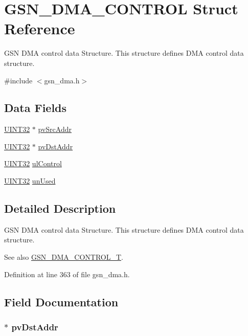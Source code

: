 \hypertarget{a00050}{
\section{GSN\_\-DMA\_\-CONTROL Struct Reference}
\label{a00050}
}


GSN DMA control data Structure. This structure defines DMA control data structure.  




{\ttfamily \#include $<$gsn\_\-dma.h$>$}

\subsection*{Data Fields}
\begin{DoxyCompactItemize}
\item 
\hyperlink{a00660_gae1e6edbbc26d6fbc71a90190d0266018}{UINT32} $\ast$ \hyperlink{a00050_a369c025bb6fdbac8a9c503cb2ae90d5b}{pvSrcAddr}
\item 
\hyperlink{a00660_gae1e6edbbc26d6fbc71a90190d0266018}{UINT32} $\ast$ \hyperlink{a00050_a5c0a75647c788624e72f3071e0f3c013}{pvDstAddr}
\item 
\hyperlink{a00660_gae1e6edbbc26d6fbc71a90190d0266018}{UINT32} \hyperlink{a00050_a5010fc8f1769629024680e6365279fab}{ulControl}
\item 
\hyperlink{a00660_gae1e6edbbc26d6fbc71a90190d0266018}{UINT32} \hyperlink{a00050_adf9df21c87565bcf3fd5f636086eff39}{unUsed}
\end{DoxyCompactItemize}


\subsection{Detailed Description}
GSN DMA control data Structure. This structure defines DMA control data structure. 

\begin{DoxySeeAlso}{See also}
\hyperlink{a00645_gad93c4855c9b915891cbdcfcdf2fd0ee5}{GSN\_\-DMA\_\-CONTROL\_\-T}. 
\end{DoxySeeAlso}


Definition at line 363 of file gsn\_\-dma.h.



\subsection{Field Documentation}
\hypertarget{a00050_a5c0a75647c788624e72f3071e0f3c013}{
\subsubsection[{pvDstAddr}]{$\ast$ {\bf pvDstAddr}}}
\label{a00050_a5c0a75647c788624e72f3071e0f3c013}


